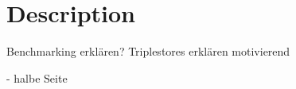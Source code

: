 \chapter{Description}
\label{ch:description}

Benchmarking erklären?
Triplestores erklären motivierend


- halbe Seite

